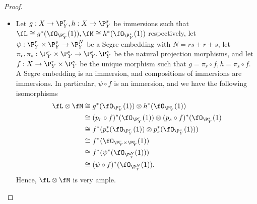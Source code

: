\documentclass[a4paper]{article}
\begin{document}
\begin{enumerate} [label=\textbf{\arabic*.}, leftmargin=0em]
\begin{proof} $ $ \vspace{0pt}
    \begin{itemize} [leftmargin=0cm]
        \item[(a)] Let $g : X \to \P_Y^r, h : X \to \P_Y^s$ be immersions such that $\fL \cong g^* (\fO_{\P_Y^r}(1)), \fM \cong h^*(\fO_{\P_Y^s}(1))$ respectively, let $\psi : \P_Y^r \times \P_Y^s \to \P_Y^N$ be a Segre embedding with $N = rs + r + s$, let $\pi_r, \pi_s : \P_Y^r \times \P_Y^s \to \P_Y^s, \P_Y^s$ be the natural projection morphisms, and let $f : X \to \P_Y^r \times \P_Y^s$ be the unique morphism such that $g = \pi_r \circ f, h = \pi_s \circ f$. A Segre embedding is an immersion, and compositions of immersions are immersions. In particular, $\psi \circ f$ is an immersion, and we have the following isomorphisms
        \begin{align*}
            \fL \otimes \fM & \cong g^*(\fO_{\P_Y^r}(1)) \otimes h^*(\fO_{\P_Y^s}(1)) \\
            & \cong (p_r \circ f)^*(\fO_{\P_Y^r}(1)) \otimes (p_s \circ f)^*(\fO_{\P_Y^s}(1) \\
            & \cong f^*(p_r^*(\fO_{\P_Y^r}(1)) \otimes p_s^*(\fO_{\P_Y^s}(1))) \\
            & \cong f^* (\fO_{\P_Y^r \times \P_Y^s}(1)) \\
            & \cong f^*(\psi^* (\fO_{\P_Y^N}(1))) \\
            & \cong (\psi \circ f)^*(\fO_{\P_Y^N}(1)).
        \end{align*}
        Hence, $\fL \otimes \fM$ is very ample.


\end{itemize}
\end{proof}
\end{enumerate}
\end{document}
